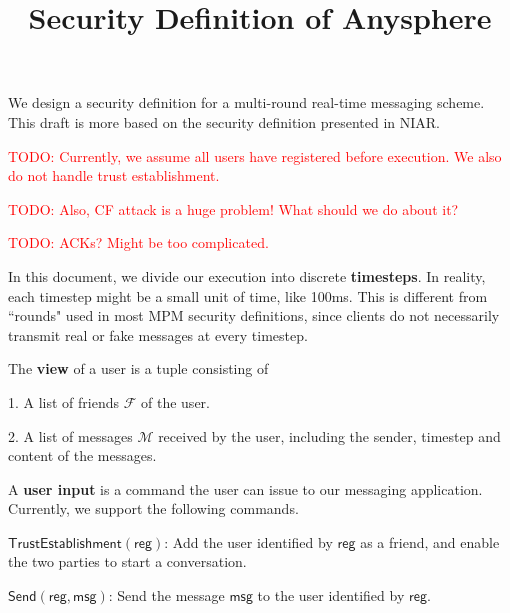 \documentclass[sigconf, nonacm, balance=false, natbib=false, screen]{acmart}
\title{Security Definition of Anysphere}
\newcommand\todo[1]{\textcolor{red}{TODO: #1}}
\newcommand{\msg}{\mathsf{msg}}
\newcommand{\reg}{\mathsf{reg}}
\newcommand{\cF}{\mathcal{F}}
\newcommand{\cM}{\mathcal{M}}
\begin{document}
\maketitle
We design a security definition for a multi-round real-time messaging scheme. This draft is more based on the security definition presented in NIAR.

\todo{Currently, we assume all users have registered before execution. We also do not handle trust establishment.}

\todo{Also, CF attack is a huge problem! What should we do about it?}

\todo{ACKs? Might be too complicated.}
\begin{definition}
In this document, we divide our execution into discrete \textbf{timesteps}. In reality, each timestep might be a small unit of time, like 100ms. This is different from ``rounds" used in most MPM security definitions, since clients do not necessarily transmit real or fake messages at every timestep.
\end{definition}
\begin{definition}
The \textbf{view} of a user is a tuple consisting of

1. A list of friends $\cF$ of the user.

2. A list of messages $\cM$ received by the user, including the sender, timestep and content of the messages.
\end{definition}
\begin{definition}
A \textbf{user input} is a command the user can issue to our messaging application. Currently, we support the following commands.

$\mathsf{TrustEstablishment}(\reg)$: Add the user identified by $\reg$ as a friend, and enable the two parties to start a conversation.

$\mathsf{Send}(\reg, \msg)$: Send the message $\msg$ to the user identified by $\reg$.


\end{definition}
\end{document}
